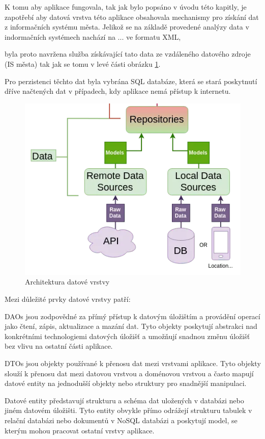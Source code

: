K tomu aby aplikace fungovala, tak jak bylo popsáno v úvodu této kapitly, je zapotřebí aby datová vrstva této aplikace obsahovala mechanismy pro
 získání dat z informačních systému města. Jelikož se na základě provedené analýzy data v indormačních systémech nachází na ... ve formatu XML, 


 byla proto navržena služba získávající tato data ze vzdáleného datového zdroje (IS města) tak jak se tomu v levé části obrázku \ref{fig:arch_data_layer}. 

Pro perzistenci těchto dat byla vybrána SQL databáze, která se stará poskytnutí dříve načtených dat v případech, kdy aplikace nemá přístup k internetu.


\begin{figure}[H]
  \centering
  \includegraphics[width=.5\textwidth]{data_layer_diagram.png}
  \caption{Architektura datové vrstvy}
  \label{fig:arch_data_layer}
\end{figure}


Mezi důležité prvky datové vrstvy patří:

DAOs jsou zodpovědné za přímý přístup k datovým úložištím a provádění operací jako čtení, zápis, aktualizace a mazání dat. Tyto objekty 
poskytují abstrakci nad konkrétními technologiemi datových úložišť a umožňují snadnou změnu úložišť bez vlivu na ostatní části aplikace.

DTOs jsou objekty používané k přenosu dat mezi vrstvami aplikace. Tyto objekty slouží k přenosu dat mezi datovou vrstvou a doménovou 
vrstvou a často mapují datové entity na jednodušší objekty nebo struktury pro snadnější manipulaci.

Datové entity představují strukturu a schéma dat uložených v databázi nebo jiném datovém úložišti. Tyto entity obvykle přímo odrážejí
strukturu tabulek v relační databázi nebo dokumentů v NoSQL databázi a poskytují model, se kterým mohou pracovat ostatní vrstvy aplikace.

